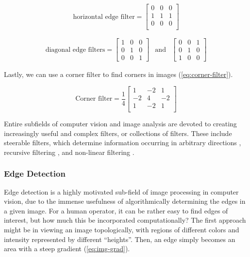 \begin{equation}
    \text{horizontal edge filter} =\begin{bmatrix}
        0 & 0 & 0 \\
        1 & 1 & 1 \\
        0 & 0 & 0 \\
    \end{bmatrix}
    \label{eq:horiz-edge-filter}
\end{equation}

\begin{equation}
    \begin{aligned}
        \text{diagonal edge filters} = \begin{bmatrix}
            1 & 0 & 0 \\
            0 & 1 & 0\\
            0 & 0 & 1
        \end{bmatrix}& \text{and} & 
        \begin{bmatrix}
            0 & 0 & 1 \\
            0 & 1 & 0\\
            1 & 0 & 0
        \end{bmatrix}
    \end{aligned}
    \label{eq:diag-edge-filter}
\end{equation}

Lastly, we can use a corner filter to find corners in images (\cref{eq:corner-filter}).

\begin{equation}
    \text{Corner filter} = \frac{1}{4}\begin{bmatrix}
        1 & -2 & 1 \\
        -2 & 4 & -2 \\
        1 & -2 & 1 \\
    \end{bmatrix}
    \label{eq:corner-filter}
\end{equation}

Entire subfields of computer vision and image analysis are devoted to creating increasingly useful and complex filters, or collections of filters. These include steerable filters, which determine information occurring in arbitrary directions \cite{freemanSteerableFiltersLocal1992}, recursive filtering \cite{nielsenRegularizationScalespaceEdge1996}, and non-linear filtering \cite{tomasiBilateralFilteringGray1998}.

\subsubsection{Edge Detection}
Edge detection is a highly motivated sub-field of image processing in computer vision, due to the immense usefulness of algorithmically determining the edges in a given image. For a human operator, it can be rather easy to find edges of interest, but how much this be incorporated computationally? The first approach might be in viewing an image topologically, with regions of different colors and intensity represented by different ``heights''. Then, an edge simply becomes an area with a steep gradient (\cref{eq:img-grad}).

